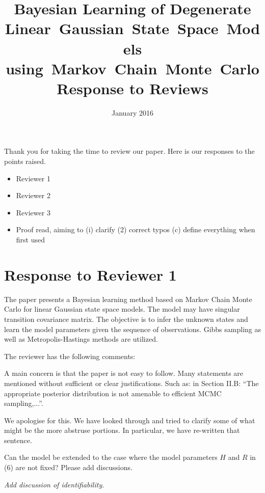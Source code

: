 \documentclass{article}
\title{Bayesian Learning of Degenerate Linear~Gaussian~State~Space~Models using~Markov~Chain~Monte~Carlo \\ Response to Reviews}
\date{January 2016}
\newenvironment{review}[0]{\begin{itshape}\color{Gray}\noindent}{\end{itshape}\vspace{0.4cm}}
\newenvironment{response}[0]{\noindent}{\vspace{0.4cm}}
\newcommand{\meta}[1]{{\color{red}\em #1}}
\begin{document}
\maketitle

Thank you for taking the time to review our paper. Here is our responses to the points raised.

\meta{
\begin{itemize}
 \item Reviewer 1
 \item Reviewer 2
 \item Reviewer 3
 \item Proof read, aiming to (i) clarify (2) correct typos (c) define everything when first used
\end{itemize}

}

\section*{Response to Reviewer 1}

\begin{review}
The paper presents a Bayesian learning method based on Markov Chain Monte Carlo for linear Gaussian state space models. The model may have singular transition covariance matrix. The objective is to infer the unknown states and learn the model parameters given the sequence of observations. Gibbs sampling as well as Metropolis-Hastings methods are utilized.

The reviewer has the following comments:

A main concern is that the paper is not easy to follow. Many statements are mentioned without sufficient or clear justifications. Such as: in Section II.B: ``The appropriate posterior distribution is not amenable to efficient MCMC sampling,...''.
\end{review}

\begin{response}
 We apologise for this. We have looked through and tried to clarify some of what might be the more abstruse portions. In particular, we have re-written that sentence.
\end{response}

\begin{review}
Can the model be extended to the case where the model parameters $H$ and $R$ in (6) are not fixed? Please add discussions.
\end{review}

\begin{response}
 \meta{Add discussion of identifiability.}
\end{response}
\end{document}
